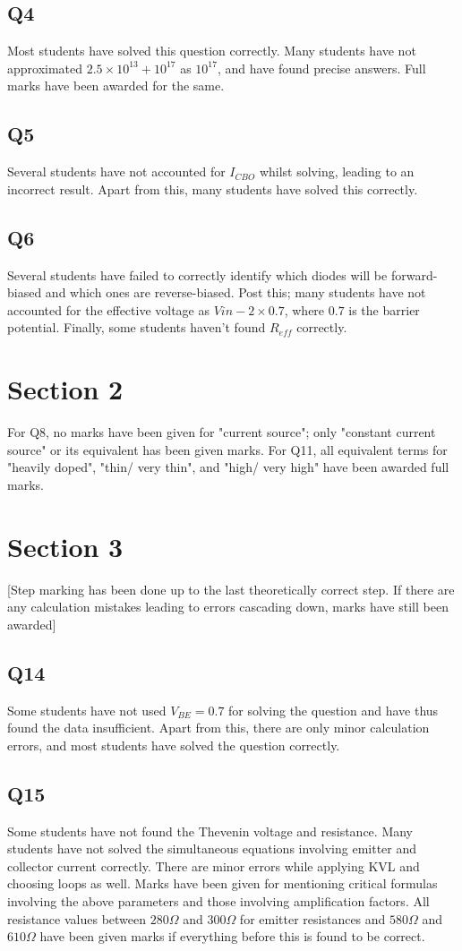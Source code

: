 \documentclass[12pt]{article}\date{}
\begin{document}
\subsection{Q4}
Most students have solved this question correctly. Many students have not approximated $2.5 \times 10^{13}+10^{17}$ as $10^{17}$, and have found precise answers. Full marks have been awarded for the same.
\subsection{Q5}
Several students have not accounted for $I_{CBO}$ whilst solving, leading to an incorrect result. Apart from this, many students have solved this correctly.
\subsection{Q6}
Several students have failed to correctly identify which diodes will be forward-biased and which ones are reverse-biased. Post this; many students have not accounted for the effective voltage as $Vin-2\times 0.7$, where $0.7$ is the barrier potential. Finally, some students haven't found $R_{eff}$ correctly.

\section{Section 2}
For Q8, no marks have been given for "current source"; only "constant current source" or its equivalent has been given marks. For Q11, all equivalent terms for "heavily doped", "thin/ very thin", and "high/ very high" have been awarded full marks. 

\section{Section 3}
[Step marking has been done up to the last theoretically correct step. If there are any calculation mistakes leading to errors cascading down, marks have still been awarded]
\subsection{Q14}
Some students have not used $V_{BE}=0.7$ for solving the question and have thus found the data insufficient. Apart from this, there are only minor calculation errors, and most students have solved the question correctly.
\subsection{Q15}
Some students have not found the Thevenin voltage and resistance. Many students have not solved the simultaneous equations involving emitter and collector current correctly. There are minor errors while applying KVL and choosing loops as well. Marks have been given for mentioning critical formulas involving the above parameters and those involving amplification factors. All resistance values between $280 \Omega$ and $300 \Omega$ for emitter resistances and $580 \Omega$ and $610 \Omega$ have been given marks if everything before this is found to be correct.
\end{document}
